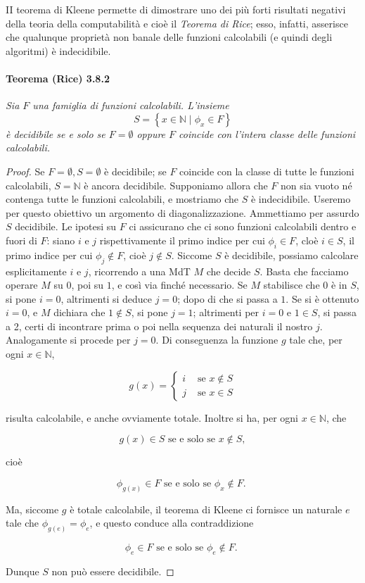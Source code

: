 II teorema di Kleene permette di
dimostrare uno dei più forti risultati negativi della teoria della computabilità e
cioè il \textit{Teorema di Rice}; esso, infatti, asserisce che qualunque proprietà non banale
delle funzioni calcolabili (e quindi degli algoritmi) è indecidibile.

\paragraph{Teorema (Rice) 3.8.2} \textit{Sia $F$ una famiglia di funzioni calcolabili. L'insieme}
$$
    S=\left\{x \in \mathbb{N} \mid \phi_x \in F\right\}
$$
\textit{è decidibile se e solo se $F=\emptyset$ oppure $F$ coincide con l'intera classe delle
    funzioni calcolabili.}

\begin{proof}
    Se $F=\emptyset, S=\emptyset$ è decidibile; se $F$ coincide con la
    classe di tutte le funzioni calcolabili, $S=\mathbb{N}$ è ancora decidibile.
    Supponiamo allora che $F$ non sia vuoto né contenga tutte le funzioni calcolabili, e
    mostriamo che $S$ è indecidibile. Useremo per questo obiettivo un argomento di
    diagonalizzazione. Ammettiamo per assurdo $S$ decidibile. Le ipotesi su $F$ ci
    assicurano che ci sono funzioni calcolabili dentro e fuori di $F$: siano $i$ e $j$
    rispettivamente il primo indice per cui $\phi_i \in F$, cloè $i \in S$, il primo
    indice per cui $\phi_j \notin F$, cioè $j \notin S$. Siccome $S$ è decidibile,
    possiamo calcolare esplicitamente $i$ e $j$, ricorrendo a una MdT $M$
    che decide $S$. Basta che facciamo operare $M$ su $0$, poi su $1$, e così via
    finché necessario. Se $M$ stabilisce che $0$ è in $S$, si pone $i=0$,
    altrimenti si deduce $j=0$; dopo di che si passa a $1$. Se si è ottenuto
    $i=0$, e $M$ dichiara che $1 \notin S$, si pone $j=1$; altrimenti per $i=0$
    e $1 \in S$, si passa a 2, certi di incontrare prima o poi nella sequenza
    dei naturali il nostro $j$. Analogamente si procede per $j=0$. Di
    conseguenza la funzione $g$ tale che, per ogni $x \in \mathbb{N}$,

    \[
        g(x)= \begin{cases}i & \text { se } x \notin S \\ j & \text { se } x \in S\end{cases}
    \]

    risulta calcolabile, e anche ovviamente totale. Inoltre si ha, per ogni $x \in
        \mathbb{N}$, che

    \[
        g(x) \in S \text { se e solo se } x \notin S,
    \]

    cioè

    \[
        \phi_{g(x)} \in F \text { se e solo se } \phi_x \notin F \text {. }
    \]

    Ma, siccome $g$ è totale calcolabile, il teorema di Kleene ci fornisce un
    naturale $e$ tale che $\phi_{g(e)}=\phi_e$, e questo conduce alla contraddizione

    \[
        \phi_e \in F \text { se e solo se } \phi_e \notin F \text {. }
    \]

    Dunque $S$ non può essere decidibile.
\end{proof}

